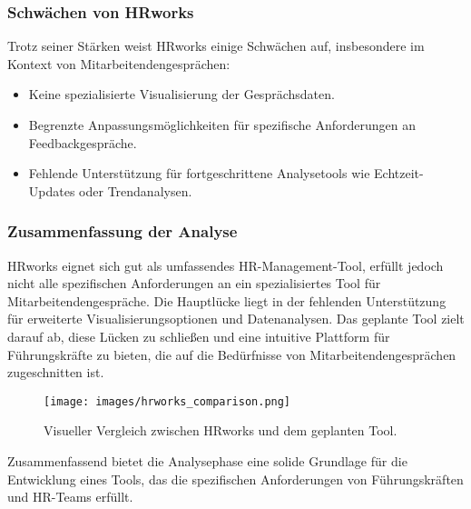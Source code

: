 \subsubsection{Schwächen von HRworks}
Trotz seiner Stärken weist HRworks einige Schwächen auf, insbesondere im Kontext von Mitarbeitendengesprächen:
\begin{itemize}
    \item Keine spezialisierte Visualisierung der Gesprächsdaten.
    \item Begrenzte Anpassungsmöglichkeiten für spezifische Anforderungen an Feedbackgespräche.
    \item Fehlende Unterstützung für fortgeschrittene Analysetools wie Echtzeit-Updates oder Trendanalysen.
\end{itemize}

\subsubsection{Zusammenfassung der Analyse}
HRworks eignet sich gut als umfassendes HR-Management-Tool, erfüllt jedoch nicht alle spezifischen Anforderungen an ein spezialisiertes Tool für Mitarbeitendengespräche. Die Hauptlücke liegt in der fehlenden Unterstützung für erweiterte Visualisierungsoptionen und Datenanalysen. Das geplante Tool zielt darauf ab, diese Lücken zu schließen und eine intuitive Plattform für Führungskräfte zu bieten, die auf die Bedürfnisse von Mitarbeitendengesprächen zugeschnitten ist.

\begin{figure}[h!]
    \centering
    \texttt{[image: images/hrworks\_comparison.png]}
    \caption{Visueller Vergleich zwischen HRworks und dem geplanten Tool.}
    \label{fig:hrworks_comparison}
\end{figure}

Zusammenfassend bietet die Analysephase eine solide Grundlage für die Entwicklung eines Tools, das die spezifischen Anforderungen von Führungskräften und HR-Teams erfüllt.
